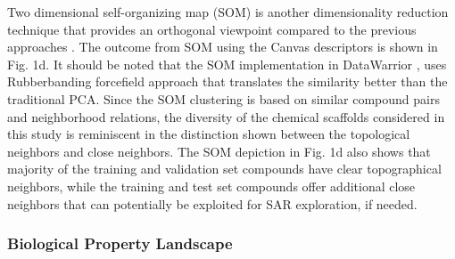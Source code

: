 Two dimensional self-organizing map (SOM) \cite{kohonen1998self} is another dimensionality reduction technique that provides an orthogonal viewpoint compared to the previous approaches \cite{osolodkin2015progress}. The outcome from SOM using the Canvas descriptors is shown in Fig. 1d.  It should be noted that the SOM implementation in DataWarrior \cite{sander2015datawarrior}, uses Rubberbanding forcefield approach that translates the similarity better than the traditional PCA.  Since the SOM clustering is based on similar compound pairs and neighborhood relations, the diversity of the chemical scaffolds considered in this study is reminiscent in the distinction shown between the topological neighbors and close neighbors.  The SOM depiction in Fig. 1d also shows that majority of the training and validation set compounds have clear topographical neighbors, while the training and test set compounds offer additional close neighbors that can potentially be exploited for SAR exploration, if needed. 

\subsubsection{Biological Property Landscape}

